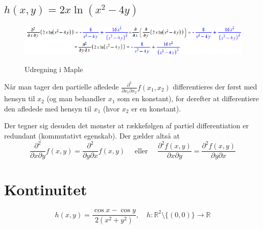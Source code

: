 \documentclass{report}
\begin{document}
\subsection{$h(x,y)=2x\ln{(x^2-4y)}$}
\begin{figure}[H]
    \centering
    \includegraphics[scale=0.8]{41.png}
    \label{fig:41}
    \caption{Udregning i Maple}
\end{figure}
Når man tager den partielle afledede $\frac{\partial^2}{\partial x_1\partial x_2}f(x_1,x_2)$ differentieres der først med hensyn til $x_2$ (og man behandler $x_1$ som en konstant), for derefter at differentiere den afledede med hensyn til $x_1$ (hvor $x_2$ er en konstant).\par Der tegner sig desuden det mønster at rækkefølgen af partiel differentiation er redundant (kommutativt egenskab). Der gælder altså at $$\frac{\partial^2}{\partial x\partial y} f(x,y)=\frac{\partial^2}{\partial y\partial x} f(x,y)\quad\text{      eller     }\quad\frac{\partial^2f(x,y)}{\partial x\partial y}=\frac{\partial^2f(x,y)}{\partial y\partial x}$$

\section{Kontinuitet}
\begin{equation}
    h(x,y)=\frac{\cos{x}-\cos{y}}{2(x^2+y^2)},\quad h:\mathbb{R}^2\setminus\{(0,0)\}\to\mathbb{R}
\end{equation}
\end{document}
